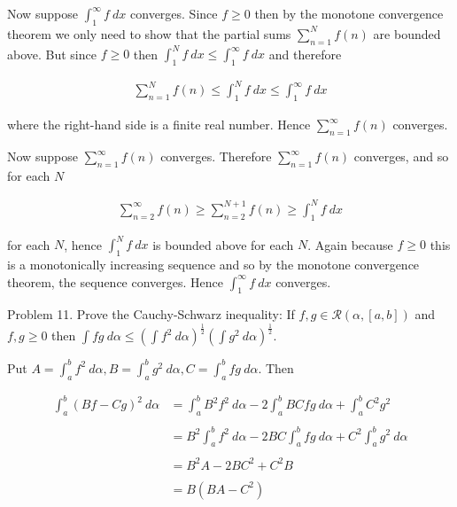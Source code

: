 \documentclass{article}
\begin{document}
  Now suppose $\int_1^\infty f \ dx$ converges. Since $f\geq 0$ then by the monotone convergence theorem we only need to show that the partial sums $\displaystyle \sum_{n=1}^N f(n)$ are bounded above.  But since $f\geq 0$ then  $\int_1^N f \ dx \leq \int_1^\infty f \ dx$ and therefore 

  \begin{align*}
    \sum_{n=1}^N f(n)\leq \int_1^N f\ dx \leq \int_1^\infty f\ dx 
  \end{align*}
  
  where the right-hand side is a finite real number.  Hence $\displaystyle\sum_{n=1}^\infty f(n)$ converges.  

  Now suppose $\displaystyle\sum_{n=1}^{\infty}f(n)$ converges.  Therefore $\displaystyle\sum_{n=1}^{\infty}f(n)$ converges, and so for each $N $

  \begin{align*}
    \sum_{n=2}^\infty f(n) \geq \sum_{n=2}^{N+1} f(n) \geq \int_1^N f \ dx
  \end{align*}

  for each $N$, hence $\int_1^N f \ dx$ is bounded above for each $N$.  Again because $f\geq 0$ this is a monotonically increasing sequence and so by the monotone convergence theorem, the sequence converges.  Hence $\int_1^\infty f \ dx$ converges.  

  \pagebreak

  {\Large \color{Sepia} Problem 11. Prove the Cauchy-Schwarz inequality: If $f,g\in\mathscr R(\alpha,[a,b])$ and $f,g\geq 0$ then \linebreak $\int fg\ d\alpha \leq \left(\int f^2\ d\alpha\right)^{\frac 1 2}\left(\int g^2\ d\alpha\right)^{\frac 1 2}$. }

  \vspace{1cm}

  Put $A=\int_a^b f^2 \ d\alpha, B=\int_a^b g^2\ d\alpha, C=\int_a^b fg \ d\alpha$.  Then

  \begin{align*}
    \int_a^b (Bf-Cg)^2\ d\alpha &= \int_a^b B^2f^2\ d\alpha -2 \int_a^b BCfg\ d\alpha + \int_a^b C^2g^2 \\\\
    &= B^2 \int_a^b f^2 \ d\alpha -2BC\int_a^b fg\ d\alpha + C^2\int_a^b g^2 \ d\alpha \\\\
    &=B^2A - 2BC^2 + C^2B \\\\
    &= B(BA - C^2)
  \end{align*}
\end{document}
